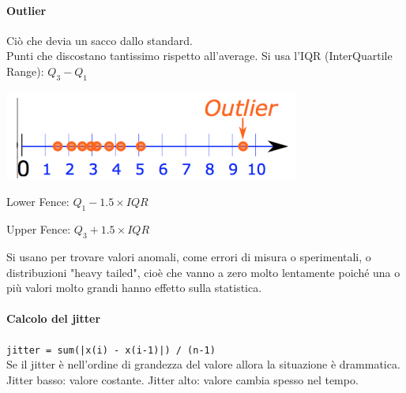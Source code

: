 \documentclass[10pt]{book}
\begin{document}
\paragraph{Outlier} Ciò che devia un sacco dallo standard.\\
Punti che discostano tantissimo rispetto all'average. Si usa l'IQR (InterQuartile Range): $Q_3 - Q_1$
\begin{center}
	\includegraphics[scale=1]{outlier.png}
\end{center}
\begin{list}{}{In statistica, un valore è un outlier quando cado fuori da}
	\item Lower Fence: $Q_1 - 1.5\times IQR$
	\item Upper Fence: $Q_3 + 1.5\times IQR$
\end{list}
Si usano per trovare valori anomali, come errori di misura o sperimentali, o distribuzioni "heavy tailed", cioè che vanno a zero molto lentamente poiché una o più valori molto grandi hanno effetto sulla statistica.
\paragraph{Calcolo del jitter} \texttt{jitter = sum(|x(i) - x(i-1)|) / (n-1)}\\
Se il jitter è nell'ordine di grandezza del valore allora la situazione è drammatica. Jitter basso: valore costante. Jitter alto: valore cambia spesso nel tempo.
\end{document}
